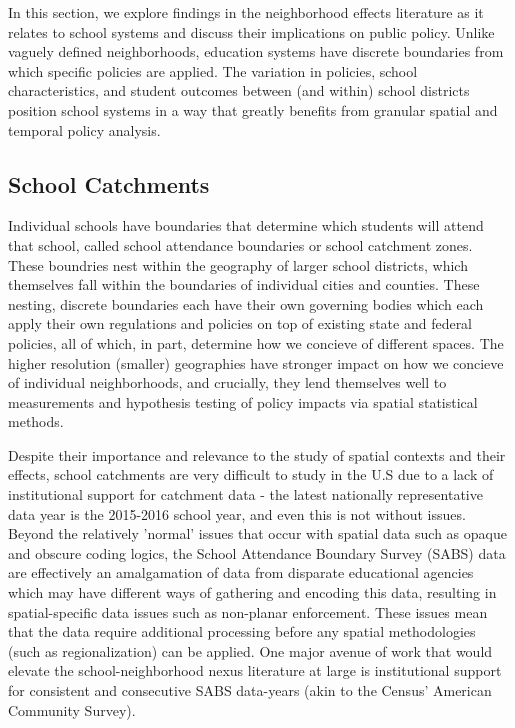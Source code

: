 In this section, we explore findings in the neighborhood effects
literature as it relates to school systems and discuss their
implications on public policy. Unlike vaguely defined neighborhoods,
education systems have discrete boundaries from which specific
policies are applied. The variation in policies, school
characteristics, and student outcomes between (and within) school
districts position school systems in a way that greatly benefits from
granular spatial and temporal policy analysis.

\subsection{School Catchments}

Individual schools have boundaries that determine which students will
attend that school, called school attendance boundaries or school
catchment zones. These boundries nest within the geography of larger
school districts, which themselves fall within the boundaries of
individual cities and counties. These nesting, discrete boundaries
each have their own governing bodies which each apply their own
regulations and policies on top of existing state and federal
policies, all of which, in part, determine how we concieve of
different spaces. The higher resolution (smaller) geographies have
stronger impact on how we concieve of individual neighborhoods, and
crucially, they lend themselves well to measurements and hypothesis
testing of policy impacts via spatial statistical methods.

Despite their importance and relevance to the study of spatial
contexts and their effects, school catchments are very difficult to
study in the U.S due to a lack of institutional support for catchment
data - the latest nationally representative data year is the 2015-2016
school year, and even this is not without issues. Beyond the
relatively 'normal' issues that occur with spatial data such as opaque
and obscure coding logics, the School Attendance Boundary Survey
(SABS) data are effectively an amalgamation of data from disparate
educational agencies which may have different ways of gathering and
encoding this data, resulting in spatial-specific data issues such as
non-planar enforcement. These issues mean that the data require
additional processing before any spatial methodologies (such as
regionalization) can be applied. One major avenue of work that would
elevate the school-neighborhood nexus literature at large is
institutional support for consistent and consecutive SABS data-years
(akin to the Census' American Community Survey).


